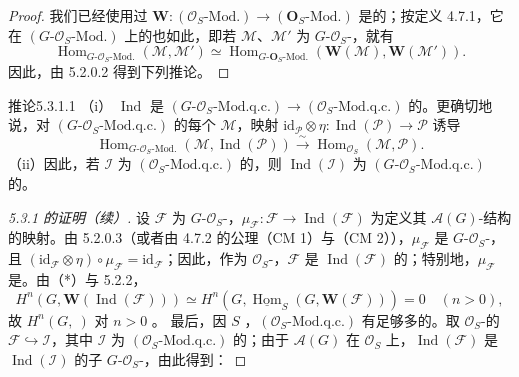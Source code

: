 \begin{proof}
我们已经使用过 $\mathbf W:(\mathcal O_S\text{-}\mathrm{Mod.})\to(\mathbf O_S\text{-}\mathrm{Mod.})$ 是的；按定义 4.7.1，它在 $(G\text{-}\mathcal O_S\text{-}\mathrm{Mod.})$ 上的也如此，即若 $\mathcal M$、$\mathcal M'$ 为 $G$-$\mathcal O_S$-，就有
\[
\operatorname{Hom}_{G\text{-}\mathcal O_S\text{-}\mathrm{Mod.}}(\mathcal M,\mathcal M')\simeq\operatorname{Hom}_{G\text{-}\mathbf O_S\text{-}\mathrm{Mod.}}(\mathbf W(\mathcal M),\mathbf W(\mathcal M')).
\]
因此，由 5.2.0.2 得到下列推论。
\end{proof}
\begin{SGAresult}{推论}{5.3.1.1}
（i） $\operatorname{Ind}$ 是 $(G\text{-}\mathcal O_S\text{-}\mathrm{Mod.q.c.})\to(\mathcal O_S\text{-}\mathrm{Mod.q.c.})$ 的。更确切地说，对 $(G\text{-}\mathcal O_S\text{-}\mathrm{Mod.q.c.})$ 的每个 $\mathcal M$，映射 $\mathrm{id}_{\mathcal P}\otimes\eta:\operatorname{Ind}(\mathcal P)\to\mathcal P$ 诱导
\[
\operatorname{Hom}_{G\text{-}\mathcal O_S\text{-}\mathrm{Mod.}}(\mathcal M,\operatorname{Ind}(\mathcal P))\xrightarrow\sim\operatorname{Hom}_{\mathcal O_S}(\mathcal M,\mathcal P).
\]
（ii）因此，若 $\mathcal I$ 为 $(\mathcal O_S\text{-}\mathrm{Mod.q.c.})$ 的，则 $\operatorname{Ind}(\mathcal I)$ 为 $(G\text{-}\mathcal O_S\text{-}\mathrm{Mod.q.c.})$ 的。
\end{SGAresult}
\begin{proof}[ 5.3.1 的证明（续）]
设 $\mathcal F$ 为 $G$-$\mathcal O_S$-，$\mu_{\mathcal F}:\mathcal F\to\operatorname{Ind}(\mathcal F)$ 为定义其 $\mathcal A(G)$-结构的映射。由 5.2.0.3（或者由 4.7.2 的公理（CM 1）与（CM 2）），$\mu_{\mathcal F}$ 是 $G$-$\mathcal O_S$-，且 $(\mathrm{id}_{\mathcal F}\otimes\eta)\circ\mu_{\mathcal F}=\mathrm{id}_{\mathcal F}$；因此，作为 $\mathcal O_S$-，$\mathcal F$ 是 $\operatorname{Ind}(\mathcal F)$ 的；特别地，$\mu_{\mathcal F}$ 是。由（*）与 5.2.2，
\[
H^n(G,\mathbf W(\operatorname{Ind}(\mathcal F)))\simeq H^n(G,\underline{\operatorname{Hom}}_S(G,\mathbf W(\mathcal F)))=0\quad(n>0),
\]
故 $H^n(G,\ )$ 对 $n>0$ 。
最后，因 $S$ ，$(\mathcal O_S\text{-}\mathrm{Mod.q.c.})$ 有足够多的。取 $\mathcal O_S$-的 $\mathcal F\hookrightarrow\mathcal I$，其中 $\mathcal I$ 为 $(\mathcal O_S\text{-}\mathrm{Mod.q.c.})$ 的；由于 $\mathcal A(G)$ 在 $\mathcal O_S$ 上，$\operatorname{Ind}(\mathcal F)$ 是 $\operatorname{Ind}(\mathcal I)$ 的子 $G$-$\mathcal O_S$-，由此得到：
\end{proof}

